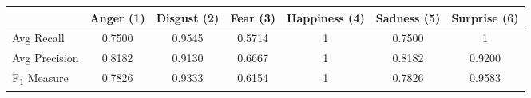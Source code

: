 \begin{center}
    \begin{tabular}{ | l || c | c | c | c | c | c | }
    \hline
          & Anger (1) & Disgust (2) & Fear (3) & Happiness (4) & Sadness (5) & Surprise (6) \\ \hline \hline
        Avg Recall & 0.7500 & 0.9545 & 0.5714 & 1 & 0.7500 & 1 \\ \hline
        Avg Precision & 0.8182 & 0.9130 & 0.6667 & 1 & 0.8182 & 0.9200 \\ \hline
        F\textsubscript{1} Measure & 0.7826 & 0.9333 & 0.6154 & 1 & 0.7826 &
        0.9583 \\ \hline
    \end{tabular}
\end{center}
